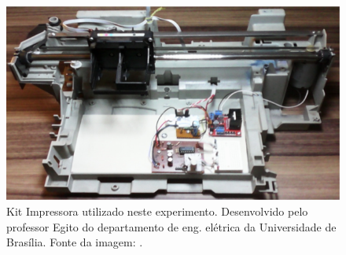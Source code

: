 \begin{figure}[ht]
	\begin{center}
		\includegraphics[width=\textwidth,keepaspectratio]{img/kit_impressora.png}
       \caption{Kit Impressora utilizado neste experimento. Desenvolvido pelo professor Egito do departamento de eng. elétrica da Universidade de Brasília. Fonte da imagem: \cite{CDIN:Roteiro1}.}
       \label{kit_impressora}
	\end{center}
\end{figure}